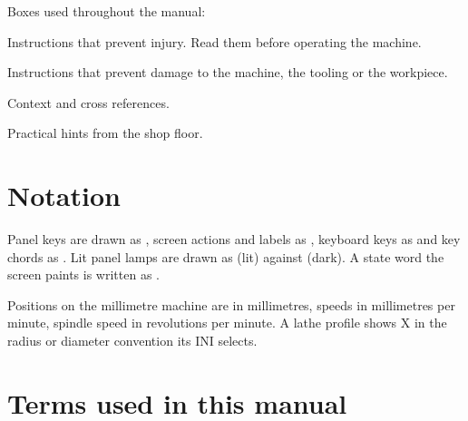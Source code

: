 Boxes used throughout the manual:

\begin{safetybox}
  Instructions that prevent injury. Read them before operating the machine.
\end{safetybox}
\begin{cautionbox}
  Instructions that prevent damage to the machine, the tooling or the workpiece.
\end{cautionbox}
\begin{notebox}
  Context and cross references.
\end{notebox}
\begin{tipbox}
  Practical hints from the shop floor.
\end{tipbox}

\section{Notation}

Panel keys are drawn as , screen actions and labels as ,
keyboard keys as  and key chords as . Lit panel
lamps are drawn as  (lit) against  (dark). A state
word the screen paints is written as .

Positions on the millimetre machine are in millimetres, speeds in millimetres per
minute, spindle speed in revolutions per minute. A lathe profile shows X in the
radius or diameter convention its INI selects.

\section{Terms used in this manual}

